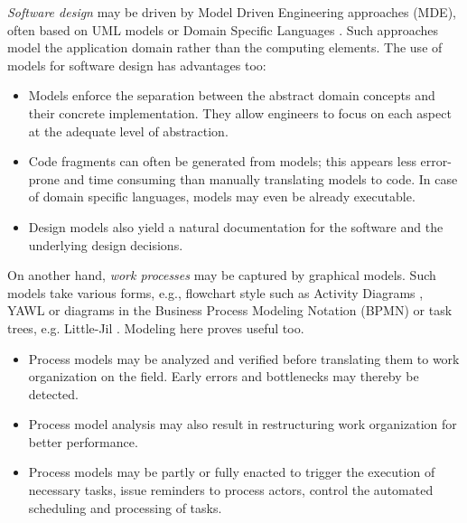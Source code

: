 \emph{Software design} may be driven by Model Driven Engineering approaches (MDE), often based on UML models \cite{OMG:2004} or Domain Specific Languages \cite{VanDeursen:2000, Fowler:2010}. Such approaches model the application domain rather than the computing elements. The use of models for software design has advantages too:
\begin{itemize}
\item Models enforce the separation between the abstract domain concepts and their concrete implementation. They allow engineers to focus on each aspect at the adequate level of abstraction.
\item Code fragments can often be generated from models; this appears less error-prone and time consuming than manually translating models to code. In case of domain specific languages, models may even be already executable. 
\item Design models also yield a natural documentation for the software and the underlying design decisions. 
\end{itemize}


On another hand, \emph{work processes} may be captured by graphical models. Such models take various forms, e.g., flowchart style such as Activity Diagrams \cite{OMG:2004}, YAWL \cite{Vanderaalst:2005} or diagrams in the Business Process Modeling Notation (BPMN) \cite{OMG:2008} or task trees, e.g. Little-Jil \cite{Clarke:2008}. Modeling here proves useful too.
\begin{itemize}
\item Process models may be analyzed and verified before translating them to work organization on the field. Early errors and bottlenecks may thereby be detected.
\item Process model analysis may also result in restructuring work organization for better performance.
\item Process models may be partly or fully enacted to trigger the execution of necessary tasks, issue reminders to process actors, control the automated scheduling and processing of tasks.
\end{itemize}

